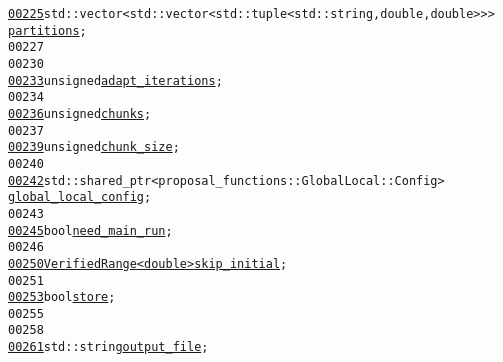 \begin{footnotesize}
\begin{alltt}
\hypertarget{markov__chain__sampler_8hh_source_l00225}{}\hyperlink{classeos_1_1MarkovChainSampler_1_1Config_a86b460f2153f55c4d5763f50f5bdba95}{00225}             std::vector<std::vector<std::tuple<std::string, double, double>>> 
      \hyperlink{classeos_1_1MarkovChainSampler_1_1Config_a86b460f2153f55c4d5763f50f5bdba95}{partitions};
00227 
00230 
\hypertarget{markov__chain__sampler_8hh_source_l00233}{}\hyperlink{classeos_1_1MarkovChainSampler_1_1Config_ad90feb40e232329acf8a1fb785ed2d87}{00233}             \textcolor{keywordtype}{unsigned} \hyperlink{classeos_1_1MarkovChainSampler_1_1Config_ad90feb40e232329acf8a1fb785ed2d87}{adapt_iterations};
00234 
\hypertarget{markov__chain__sampler_8hh_source_l00236}{}\hyperlink{classeos_1_1MarkovChainSampler_1_1Config_a5e5751b084b471b08aa6f33513c28047}{00236}             \textcolor{keywordtype}{unsigned} \hyperlink{classeos_1_1MarkovChainSampler_1_1Config_a5e5751b084b471b08aa6f33513c28047}{chunks};
00237 
\hypertarget{markov__chain__sampler_8hh_source_l00239}{}\hyperlink{classeos_1_1MarkovChainSampler_1_1Config_a3286979755ea75bd563fb66fba9e5330}{00239}             \textcolor{keywordtype}{unsigned} \hyperlink{classeos_1_1MarkovChainSampler_1_1Config_a3286979755ea75bd563fb66fba9e5330}{chunk_size};
00240 
\hypertarget{markov__chain__sampler_8hh_source_l00242}{}\hyperlink{classeos_1_1MarkovChainSampler_1_1Config_ac717ab2f0caa32cc13b5e382f8b19cec}{00242}             std::shared\_ptr<proposal\_functions::GlobalLocal::Config> 
      \hyperlink{classeos_1_1MarkovChainSampler_1_1Config_ac717ab2f0caa32cc13b5e382f8b19cec}{global_local_config};
00243 
\hypertarget{markov__chain__sampler_8hh_source_l00245}{}\hyperlink{classeos_1_1MarkovChainSampler_1_1Config_a1efc4d04039ba60a1f4c27ae28fe1554}{00245}             \textcolor{keywordtype}{bool} \hyperlink{classeos_1_1MarkovChainSampler_1_1Config_a1efc4d04039ba60a1f4c27ae28fe1554}{need_main_run};
00246 
\hypertarget{markov__chain__sampler_8hh_source_l00250}{}\hyperlink{classeos_1_1MarkovChainSampler_1_1Config_a8db6eb333e22a68f8b7abbd96b02b88c}{00250}             \hyperlink{classeos_1_1VerifiedRange}{VerifiedRange<double>} \hyperlink{classeos_1_1MarkovChainSampler_1_1Config_a8db6eb333e22a68f8b7abbd96b02b88c}{skip_initial};
00251 
\hypertarget{markov__chain__sampler_8hh_source_l00253}{}\hyperlink{classeos_1_1MarkovChainSampler_1_1Config_a61732b63555e375ca22b7c31e3df12b6}{00253}             \textcolor{keywordtype}{bool} \hyperlink{classeos_1_1MarkovChainSampler_1_1Config_a61732b63555e375ca22b7c31e3df12b6}{store};
00255 
00258 
\hypertarget{markov__chain__sampler_8hh_source_l00261}{}\hyperlink{classeos_1_1MarkovChainSampler_1_1Config_a09fb2c6eeddd6bdde3ac5de54f63433f}{00261}             std::string \hyperlink{classeos_1_1MarkovChainSampler_1_1Config_a09fb2c6eeddd6bdde3ac5de54f63433f}{output_file};

\end{alltt}
\end{footnotesize}
